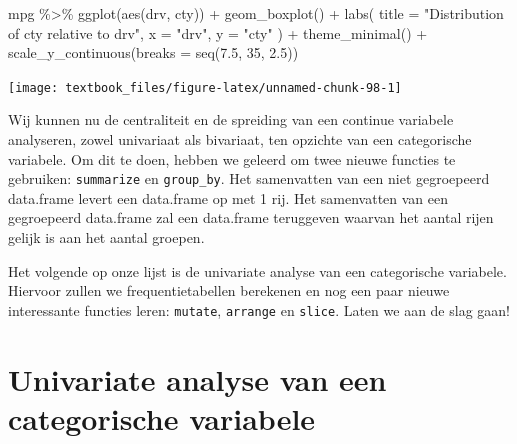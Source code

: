 \documentclass[]{tufte-book}
\newenvironment{Shaded}{}{}
\newcommand{\AttributeTok}[1]{\textcolor[rgb]{0.49,0.56,0.16}{#1}}
\newcommand{\DecValTok}[1]{\textcolor[rgb]{0.25,0.63,0.44}{#1}}
\newcommand{\FloatTok}[1]{\textcolor[rgb]{0.25,0.63,0.44}{#1}}
\newcommand{\FunctionTok}[1]{\textcolor[rgb]{0.02,0.16,0.49}{#1}}
\newcommand{\NormalTok}[1]{#1}
\newcommand{\SpecialCharTok}[1]{\textcolor[rgb]{0.25,0.44,0.63}{#1}}
\newcommand{\StringTok}[1]{\textcolor[rgb]{0.25,0.44,0.63}{#1}}
\begin{document}
\begin{Shaded}
\begin{Highlighting}[]
\NormalTok{mpg }\SpecialCharTok{\%\textgreater{}\%}
  \FunctionTok{ggplot}\NormalTok{(}\FunctionTok{aes}\NormalTok{(drv, cty)) }\SpecialCharTok{+}
  \FunctionTok{geom\_boxplot}\NormalTok{() }\SpecialCharTok{+}
  \FunctionTok{labs}\NormalTok{(}
    \AttributeTok{title =} \StringTok{"Distribution of cty relative to drv"}\NormalTok{,}
    \AttributeTok{x =} \StringTok{"drv"}\NormalTok{,}
    \AttributeTok{y =} \StringTok{"cty"}
\NormalTok{  ) }\SpecialCharTok{+}
  \FunctionTok{theme\_minimal}\NormalTok{() }\SpecialCharTok{+}
  \FunctionTok{scale\_y\_continuous}\NormalTok{(}\AttributeTok{breaks =} \FunctionTok{seq}\NormalTok{(}\FloatTok{7.5}\NormalTok{, }\DecValTok{35}\NormalTok{, }\FloatTok{2.5}\NormalTok{))}
\end{Highlighting}
\end{Shaded}

\texttt{[image: textbook\_files/figure-latex/unnamed-chunk-98-1]}

Wij kunnen nu de centraliteit en de spreiding van een continue variabele analyseren, zowel univariaat als bivariaat, ten opzichte van een categorische variabele. Om dit te doen, hebben we geleerd om twee nieuwe functies te gebruiken: \texttt{summarize} en \texttt{group\_by}. Het samenvatten van een niet gegroepeerd data.frame levert een data.frame op met 1 rij. Het samenvatten van een gegroepeerd data.frame zal een data.frame teruggeven waarvan het aantal rijen gelijk is aan het aantal groepen.

Het volgende op onze lijst is de univariate analyse van een categorische variabele. Hiervoor zullen we frequentietabellen berekenen en nog een paar nieuwe interessante functies leren: \texttt{mutate}, \texttt{arrange} en \texttt{slice}. Laten we aan de slag gaan!

\newpage

\hypertarget{univariate-analyse-van-een-categorische-variabele}{%
\section{Univariate analyse van een categorische variabele}\label{univariate-analyse-van-een-categorische-variabele}}
\end{document}

